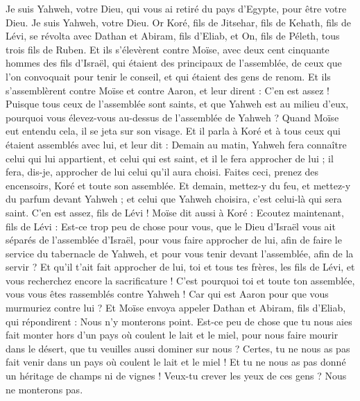 \begin{multicols}{2}
Je suis Yahweh, votre Dieu, qui vous ai retiré du pays d'Egypte, pour être votre Dieu. Je suis Yahweh, votre Dieu.
\VerseOne{}Or Koré, fils de Jitsehar, fils de Kehath, fils de Lévi, se révolta avec Dathan et Abiram, fils d'Eliab, et On, fils de Péleth, tous trois fils de Ruben.
Et ils s'élevèrent contre Moïse, avec deux cent cinquante hommes des fils d'Israël, qui étaient des principaux de l'assemblée, de ceux que l'on convoquait pour tenir le conseil, et qui étaient des gens de renom.
Et ils s'assemblèrent contre Moïse et contre Aaron, et leur dirent : C'en est assez ! Puisque tous ceux de l'assemblée sont saints, et que Yahweh est au milieu d'eux, pourquoi vous élevez-vous au-dessus de l'assemblée de Yahweh ?
Quand Moïse eut entendu cela, il se jeta sur son visage.
Et il parla à Koré et à tous ceux qui étaient assemblés avec lui, et leur dit : Demain au matin, Yahweh fera connaître celui qui lui appartient, et celui qui est saint, et il le fera approcher de lui ; il fera, dis-je, approcher de lui celui qu'il aura choisi.
Faites ceci, prenez des encensoirs, Koré et toute son assemblée.
Et demain, mettez-y du feu, et mettez-y du parfum devant Yahweh ; et celui que Yahweh choisira, c'est celui-là qui sera saint. C'en est assez, fils de Lévi !
Moïse dit aussi à Koré : Ecoutez maintenant, fils de Lévi :
Est-ce trop peu de chose pour vous, que le Dieu d'Israël vous ait séparés de l'assemblée d'Israël, pour vous faire approcher de lui, afin de faire le service du tabernacle de Yahweh, et pour vous tenir devant l'assemblée, afin de la servir ?
Et qu'il t'ait fait approcher de lui, toi et tous tes frères, les fils de Lévi, et vous recherchez encore la sacrificature !
C'est pourquoi toi et toute ton assemblée, vous vous êtes rassemblés contre Yahweh ! Car qui est Aaron pour que vous murmuriez contre lui ?
Et Moïse envoya appeler Dathan et Abiram, fils d'Eliab, qui répondirent : Nous n'y monterons point.
Est-ce peu de chose que tu nous aies fait monter hors d'un pays où coulent le lait et le miel, pour nous faire mourir dans le désert, que tu veuilles aussi dominer sur nous ?
Certes, tu ne nous as pas fait venir dans un pays où coulent le lait et le miel ! Et tu ne nous as pas donné un héritage de champs ni de vignes ! Veux-tu crever les yeux de ces gens ? Nous ne monterons pas.

\end{multicols}
